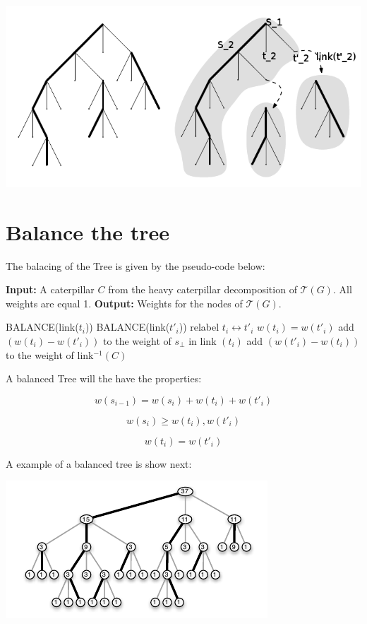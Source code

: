 \documentclass[10pt,a4paper]{article}
\newcommand{\Tau}{\mathcal{T}}
\begin{document}
\includegraphics[scale=1]{caterpillarEdit.png} 

\section{Balance the tree}


The balacing of the Tree is given by the pseudo-code below:

\begin{algorithmic}
\State \textbf{Input:} A caterpillar $C$ from the heavy caterpillar decomposition of $\Tau(G)$. All weights are equal 1.
\State \textbf{Output:} Weights for the nodes of $\Tau(G)$.

	\State BALANCE(link($t_i$))
	\State BALANCE(link($t'_i$))
        \State relabel $t_i \leftrightarrow t'_i$
    \EndIf
	\State $w(t_i)=w(t'_i)$
	\State add $(w(t_i ) - w(t'_i ))$ to the weight of $s_{\bot}$ in link $(t_i)$
	\State add $(w(t'_i ) - w(t_i ))$ to the weight of link$^{-1} (C)$
\EndFor
\EndFunction
\end{algorithmic}


A balanced Tree will the have the properties:

$$w(s_{i-1})= w(s_i) + w(t_i) + w(t'_i)$$

$$w(s_i)\geq w(t_i),w(t'_i) $$

$$w(t_i)= w(t'_i) $$

A example of a balanced tree is show next: 

\includegraphics[scale=1]{balancedTree.png} 
\end{document}
